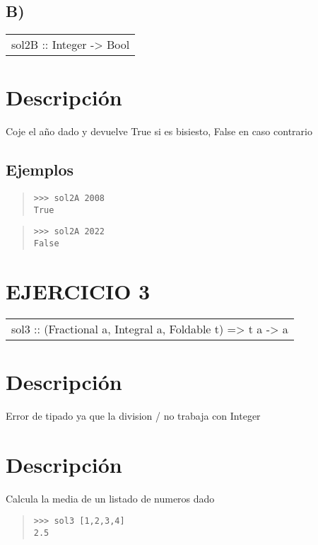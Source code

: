 \subsection{B)}
\begin{haddockdesc}
\item[\begin{tabular}{@{}l}
sol2B :: Integer -> Bool
\end{tabular}]
{\haddockbegindoc
\section*{Descripción}
Coje el año dado y devuelve True si es bisiesto, False en caso contrario\par
\subsection*{Ejemplos}
\begin{quote}
{\haddockverb\begin{verbatim}
>>> sol2A 2008
True

\end{verbatim}}
\end{quote}
\begin{quote}
{\haddockverb\begin{verbatim}
>>> sol2A 2022
False

\end{verbatim}}
\end{quote}}
\end{haddockdesc}
\section{EJERCICIO 3}
\begin{haddockdesc}
\item[\begin{tabular}{@{}l}
sol3 :: (Fractional a, Integral a, Foldable t) => t a -> a
\end{tabular}]
{\haddockbegindoc
\section*{Descripción}
Error de tipado ya que la division / no trabaja con Integer\par
\section*{Descripción}
Calcula la media de un listado de numeros dado\par
\begin{quote}
{\haddockverb\begin{verbatim}
>>> sol3 [1,2,3,4]
2.5

\end{verbatim}}
\end{quote}}
\end{haddockdesc}
